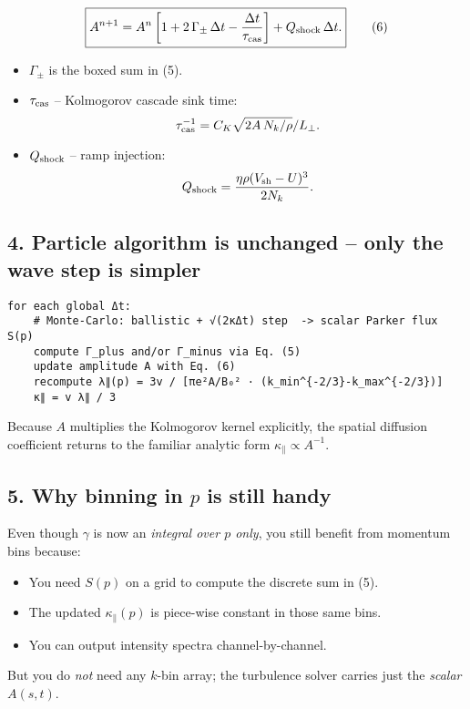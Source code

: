\[
\boxed{
A^{n+1} = A^{n}\left[1 + 2\,\Gamma_{\pm}\,\Delta t
                   - \frac{\Delta t}{\tau_{\rm cas}} \right]
          + Q_{\rm shock}\,\Delta t.
} \tag{6}
\]

\begin{itemize}
\item $\Gamma_{\pm}$ is the boxed sum in (5).
\item $\tau_{\rm cas}$ – Kolmogorov cascade sink time:
  \[
  \tau_{\rm cas}^{-1} = C_K \sqrt{2A\,N_k/\rho} / L_\perp.
  \]
\item $Q_{\rm shock}$ – ramp injection:
  \[
  Q_{\rm shock} = \frac{\eta \rho (V_{\rm sh} - U)^3}{2N_k}.
  \]
\end{itemize}

\subsection*{4. Particle algorithm is unchanged – only the wave step is simpler}

\begin{verbatim}
for each global Δt:
    # Monte-Carlo: ballistic + √(2κΔt) step  -> scalar Parker flux S(p)
    compute Γ_plus and/or Γ_minus via Eq. (5)
    update amplitude A with Eq. (6)
    recompute λ∥(p) = 3v / [πe²A/B₀² · (k_min^{-2/3}-k_max^{-2/3})]
    κ∥ = v λ∥ / 3
\end{verbatim}

Because $A$ multiplies the Kolmogorov kernel explicitly, the spatial diffusion coefficient returns to the familiar analytic form $\kappa_\parallel \propto A^{-1}$.

\subsection*{5. Why binning in $p$ is still handy}

Even though $\gamma$ is now an \emph{integral over $p$ only}, you still benefit from momentum bins because:

\begin{itemize}
\item You need $S(p)$ on a grid to compute the discrete sum in (5).
\item The updated $\kappa_\parallel(p)$ is piece-wise constant in those same bins.
\item You can output intensity spectra channel-by-channel.
\end{itemize}

But you do \emph{not} need any $k$-bin array; the turbulence solver carries just the \emph{scalar} $A(s,t)$.

